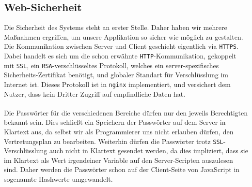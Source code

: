 \subsection{Web-Sicherheit}
Die Sicherheit des Systems steht an erster Stelle. Daher haben wir mehrere Maßnahmen ergriffen,
um unsere Applikation so sicher wie möglich zu gestalten. Die Kommunikation zwischen Server
und Client geschieht eigentlich via \texttt{HTTPS}. Dabei handelt es sich um die schon erwähnte
\texttt{HTTP}-Kommunikation, gekoppelt mit \texttt{SSL}, ein \texttt{RSA}-verschlüsseltes Protokoll,
welches ein server-spezifisches Sicherheits-Zertifikat benötigt, und globaler Standart für
Verschlüsslung im Internet ist. Dieses Protokoll ist in \texttt{nginx} implementiert, und versichert
dem Nutzer, dass kein Dritter Zugriff auf empfindliche Daten hat.\\\\
Die Passwörter für die verschiedenen Bereiche dürfen nur den jeweils Berechtigten bekannt sein. Dies
schließt ein Speichern der Passwörter auf dem Server in Klartext aus, da selbst wir als Programmierer
uns nicht erlauben dürfen, den Vertretungsplan zu bearbeiten. Weiterhin dürfen die Passwörter trotz
\texttt{SSL}-Verschlüsslung auch nicht in Klartext gesendet werden, da dies impliziert, dass sie im
Klartext als Wert irgendeiner Variable auf den Server-Scripten auszulesen sind. Daher werden die
Passwörter schon auf der Client-Seite von JavaScript in sogenannte Hashwerte umgewandelt.

